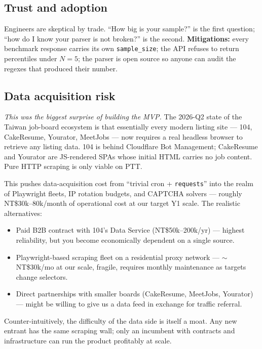 \documentclass[11pt,a4paper]{article}
\begin{document}
\subsection*{Trust and adoption}
Engineers are skeptical by trade. ``How big is your sample?'' is the first
question; ``how do I know your parser is not broken?'' is the second.
\textbf{Mitigations:} every benchmark response carries its own
\texttt{sample\_size}; the API refuses to return percentiles under
$N{=}5$; the parser is open source so anyone can audit the regexes that
produced their number.

\subsection*{Data acquisition risk}
\emph{This was the biggest surprise of building the MVP.} The 2026-Q2
state of the Taiwan job-board ecosystem is that essentially every modern
listing site --- 104, CakeResume, Yourator, MeetJobs --- now requires a
real headless browser to retrieve any listing data. 104 is behind
Cloudflare Bot Management; CakeResume and Yourator are JS-rendered
SPAs whose initial HTML carries no job content. Pure HTTP scraping is
only viable on PTT.

This pushes data-acquisition cost from ``trivial cron + \texttt{requests}''
into the realm of Playwright fleets, IP rotation budgets, and CAPTCHA
solvers --- roughly NT\$30k--80k/month of operational cost at our target
Y1 scale. The realistic alternatives:

\begin{itemize}[leftmargin=*,itemsep=0.1em,topsep=0.2em]
  \item Paid B2B contract with 104's Data Service
    (NT\$50k--200k/yr) --- highest reliability, but you become
    economically dependent on a single source.
  \item Playwright-based scraping fleet on a residential proxy
    network --- $\sim$NT\$30k/mo at our scale, fragile, requires
    monthly maintenance as targets change selectors.
  \item Direct partnerships with smaller boards (CakeResume,
    MeetJobs, Yourator) --- might be willing to give us a data feed
    in exchange for traffic referral.
\end{itemize}

Counter-intuitively, the difficulty of the data side is itself a moat.
Any new entrant has the same scraping wall; only an incumbent with
contracts and infrastructure can run the product profitably at scale.
\end{document}

